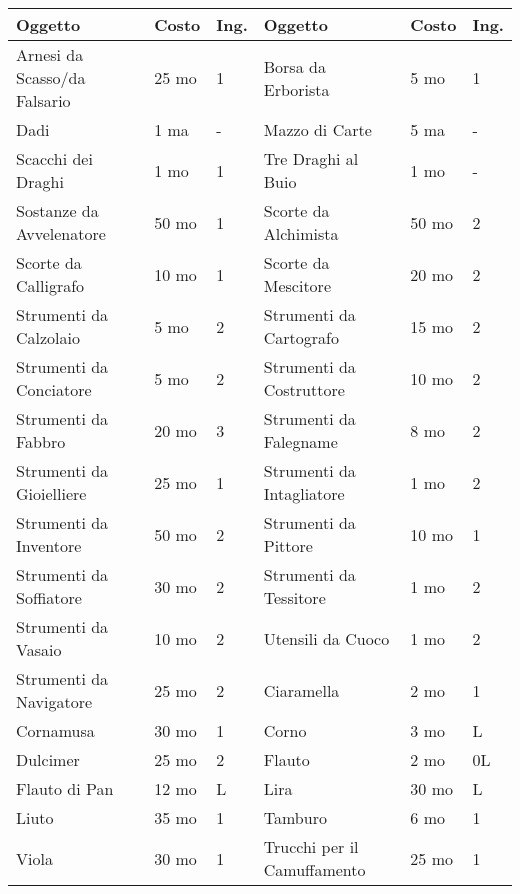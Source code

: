 \documentclass[12pt,a4paper,twoside,openany]{book}
\begin{document}
\medskip

\begin{tabularx}{0.95\textwidth}{llX|llX}
\textbf{Oggetto}&\textbf{Costo}&\textbf{Ing.}&\textbf{Oggetto}&\textbf{Costo}&\textbf{Ing.}\\
\toprule
Arnesi da Scasso/da Falsario&25 mo&1&Borsa da Erborista&5 mo&1\\
Dadi&1 ma&-&Mazzo di Carte&5 ma&-\\
Scacchi dei Draghi&1 mo&1&Tre Draghi al Buio&1 mo&-\\
Sostanze da Avvelenatore&50 mo&1&Scorte da Alchimista&50 mo&2\\
Scorte da Calligrafo&10 mo&1&Scorte da Mescitore&20 mo&2\\
Strumenti da Calzolaio&5 mo&2&Strumenti da Cartografo&15 mo&2\\
Strumenti da Conciatore&5 mo&2&Strumenti da Costruttore&10 mo&2\\
Strumenti da Fabbro&20 mo&3&Strumenti da Falegname&8 mo&2\\
Strumenti da Gioielliere&25 mo&1&Strumenti da Intagliatore&1 mo&2\\
Strumenti da Inventore&50 mo&2&Strumenti da Pittore&10 mo&1\\
Strumenti da Soffiatore&30 mo&2&Strumenti da Tessitore&1 mo&2\\
Strumenti da Vasaio&10 mo&2&Utensili da Cuoco&1 mo&2\\
Strumenti da Navigatore&25 mo&2&Ciaramella&2 mo&1\\
Cornamusa&30 mo&1&Corno&3 mo&L\\
Dulcimer&25 mo&2&Flauto&2 mo&0L\\
Flauto di Pan&12 mo&L&Lira&30 mo&L\\
Liuto&35 mo&1&Tamburo&6 mo&1\\
Viola&30 mo&1&Trucchi per il Camuffamento&25 mo&1\\
\end{tabularx}
\end{document}
